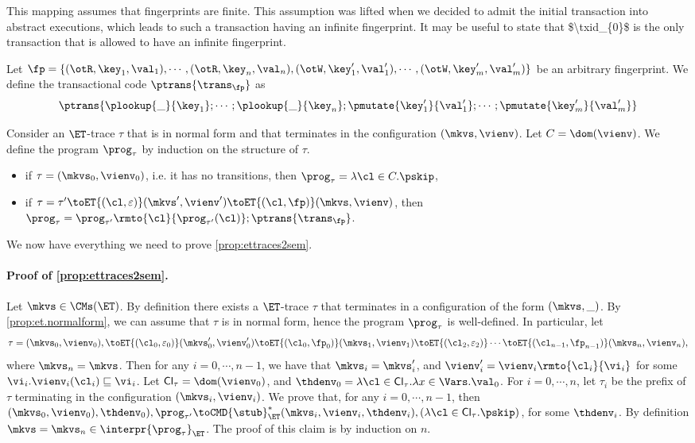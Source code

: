 \begin{definition}
\ac{This mapping assumes that fingerprints are finite. This assumption was lifted when we 
decided to admit the initial transaction into abstract executions, which leads to such a transaction 
having an infinite fingerprint. It may be useful to state that $\txid_{0}$ is the only transaction that is 
allowed to have an infinite fingerprint.}

Let $\fp = \{(\otR, \key_1, \val_1), \cdots, (\otR, \key_{n}, \val_{n}), (\otW, \key'_{1}, \val'_{1}), \cdots, (\otW, \key'_{m}, \val'_{m})\}$ be an 
arbitrary fingerprint. We define the transactional code $\ptrans{\trans_{\fp}}$ as 
\[
\ptrans{\plookup{\_}{\key_1}; \cdots ; \plookup{\_}{\key_{n}}; \pmutate{\key'_1}{\val'_1}; \cdots ; \pmutate{\key'_{m}}{\val'_{m}}}
\]

Consider an $\ET$-trace $\tau$ that is in normal form and that terminates in the configuration $(\mkvs, \vienv)$. Let $C = \dom(\vienv)$. 
We define the program $\prog_{\tau}$ by induction on the structure of $\tau$. 
\begin{itemize}
\item if $\tau = (\mkvs_{0}, \vienv_{0})$, i.e. it has no transitions, then $\prog_{\tau} = \lambda \cl \in C. \pskip$, 
\item if $\tau = \tau' \toET{(\cl, \varepsilon)} (\mkvs', \vienv') \toET{(\cl, \fp)} (\mkvs, \vienv)$, then 
$\prog_{\tau} = \prog_{\tau'}\rmto{\cl}{\prog_{\tau'}(\cl)}; \ptrans{\trans_{\fp}}$.
\end{itemize}
\end{definition}

We now have everything we need to prove \cref{prop:ettraces2sem}.
\paragraph{Proof of \cref{prop:ettraces2sem}.}
Let $\mkvs \in \CMs(\ET)$. By definition there exists a $\ET$-trace $\tau$ that 
terminates in a configuration of the form $(\mkvs, \_)$. By \cref{prop:et.normalform}, we 
can assume that $\tau$ is in normal form, hence the program $\prog_{\tau}$ is well-defined. 
In particular, let 
\[
\tau = (\mkvs_{0}, \vienv_{0}), \toET{(\cl_{0}, \varepsilon_{0})} (\mkvs_{0}', \vienv_{0}') \toET{(\cl_{0}, \fp_{0})} (\mkvs_{1}, \vienv_{1}) 
\toET{(\cl_{2}, \varepsilon_{2})} \cdots \toET{(\cl_{n-1}, \fp_{n-1})} (\mkvs_{n}, \vienv_{n}),
\]
where $\mkvs_{n} = \mkvs$. Then for any $i =0,\cdots, n-1$, we have that $\mkvs_{i} = \mkvs'_{i}$, 
and $\vienv'_{i} = \vienv_{i}\rmto{\cl_{i}}{\vi_{i}}$ for some $\vi_{i}. \vienv_{i}(\cl_{i}) \sqsubseteq \vi_{i}$.
Let $\mathsf{Cl}_{\tau} = \dom(\vienv_{0})$, and $\thdenv_{0} = \lambda \cl \in \mathsf{Cl}_{\tau}. \lambda x \in \Vars. \val_{0}$. 
For $i=0,\cdots, n$, let $\tau_{i}$ be the prefix of $\tau$ terminating in the configuration $(\mkvs_{i}, \vienv_{i})$.
We prove that, for any $i=0,\cdots, n-1$, 
then $(\mkvs_{0}, \vienv_{0}), \thdenv_{0}), \prog_{\tau'} \toCMD{\stub}^{\ast}_{\ET} (\mkvs_{i}, \vienv_{i}, \thdenv_{i}), (\lambda \cl \in \mathsf{Cl}_{\tau}.\pskip)$, 
for some $\thdenv_{i}$. By definition $\mkvs = \mkvs_{n} \in \interpr{\prog_{\tau}}_{\ET}$. 
The proof of this claim is by induction on $n$.

